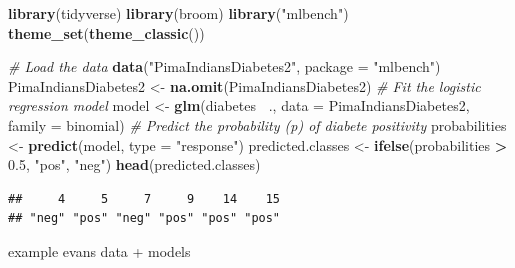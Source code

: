\documentclass[
]{article}
\newenvironment{Shaded}{\begin{snugshade}}{\end{snugshade}}
\newcommand{\CommentTok}[1]{\textcolor[rgb]{0.56,0.35,0.01}{\textit{#1}}}
\newcommand{\DataTypeTok}[1]{\textcolor[rgb]{0.13,0.29,0.53}{#1}}
\newcommand{\FloatTok}[1]{\textcolor[rgb]{0.00,0.00,0.81}{#1}}
\newcommand{\KeywordTok}[1]{\textcolor[rgb]{0.13,0.29,0.53}{\textbf{#1}}}
\newcommand{\NormalTok}[1]{#1}
\newcommand{\OperatorTok}[1]{\textcolor[rgb]{0.81,0.36,0.00}{\textbf{#1}}}
\newcommand{\StringTok}[1]{\textcolor[rgb]{0.31,0.60,0.02}{#1}}
\begin{document}
\begin{Shaded}
\begin{Highlighting}[]
\KeywordTok{library}\NormalTok{(tidyverse)}
\KeywordTok{library}\NormalTok{(broom)}
\KeywordTok{library}\NormalTok{(}\StringTok{"mlbench"}\NormalTok{)}
\KeywordTok{theme_set}\NormalTok{(}\KeywordTok{theme_classic}\NormalTok{())}

\CommentTok{# Load the data}
\KeywordTok{data}\NormalTok{(}\StringTok{"PimaIndiansDiabetes2"}\NormalTok{, }\DataTypeTok{package =} \StringTok{"mlbench"}\NormalTok{)}
\NormalTok{PimaIndiansDiabetes2 <-}\StringTok{ }\KeywordTok{na.omit}\NormalTok{(PimaIndiansDiabetes2)}
\CommentTok{# Fit the logistic regression model}
\NormalTok{model <-}\StringTok{ }\KeywordTok{glm}\NormalTok{(diabetes }\OperatorTok{~}\NormalTok{., }\DataTypeTok{data =}\NormalTok{ PimaIndiansDiabetes2, }
               \DataTypeTok{family =}\NormalTok{ binomial)}
\CommentTok{# Predict the probability (p) of diabete positivity}
\NormalTok{probabilities <-}\StringTok{ }\KeywordTok{predict}\NormalTok{(model, }\DataTypeTok{type =} \StringTok{"response"}\NormalTok{)}
\NormalTok{predicted.classes <-}\StringTok{ }\KeywordTok{ifelse}\NormalTok{(probabilities }\OperatorTok{>}\StringTok{ }\FloatTok{0.5}\NormalTok{, }\StringTok{"pos"}\NormalTok{, }\StringTok{"neg"}\NormalTok{)}
\KeywordTok{head}\NormalTok{(predicted.classes)}
\end{Highlighting}
\end{Shaded}

\begin{verbatim}
##     4     5     7     9    14    15 
## "neg" "pos" "neg" "pos" "pos" "pos"
\end{verbatim}

example evans data + models
\end{document}
